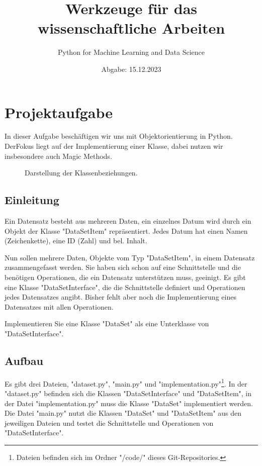 \documentclass[
 12pt, %
 a4paper, %
 parskip=full %
]{scrartcl}
\begin{document}
 \title{Werkzeuge für das wissenschaftliche Arbeiten}
 \subtitle{Python for Machine Learning and Data Science}
 \date{Abgabe: 15.12.2023}
 \maketitle
 \section{Projektaufgabe}
 
 In dieser Aufgabe beschäftigen wir uns mit Objektorientierung in Python. DerFokus liegt auf der Implementierung einer Klasse, dabei nutzen wir insbesondere auch Magic Methods.
 
 \begin{figure}
 \centering
 
 \caption{
 Darstellung der Klassenbeziehungen.
 } \label{fig:dur}
\end{figure}
 

    \subsection{Einleitung} Ein Datensatz besteht aus mehreren Daten, ein einzelnes Datum wird durch ein Objekt der Klasse "DataSetItem" repräsentiert.
    Jedes Datum hat einen Namen (Zeichenkette), eine ID (Zahl) und bel. Inhalt.\par

    Nun sollen mehrere Daten, Objekte vom Typ "DataSetItem", in einem Datensatz zusammengefasst werden.
    Sie haben sich schon auf eine Schnittstelle und die benötigen Operationen, die ein Datensatz unterstützen muss, geeinigt.
    Es gibt eine Klasse "DataSetInterface", die die Schnittstelle definiert und Operationen jedes Datensatzes angibt.
    Bisher fehlt aber noch die Implementierung eines Datensatzes mit allen Operationen.\par
    
    Implementieren Sie eine Klasse "DataSet" als eine Unterklasse von "DataSetInterface".

    \subsection{Aufbau} Es gibt drei Dateien, "dataset.py", "main.py" und 
    "implementation.py"\footnote{Dateien befinden sich im Ordner "/code/" dieses Git-Repositories.}.
    In der "dataset.py" befinden sich die Klassen "DataSetInterface" und "DataSetItem",
    in der Datei "implementation.py" muss die Klasse "DataSet" implementiert werden.
    Die Datei "main.py" nutzt die Klassen "DataSet" und "DataSetItem" aus den jeweiligen Dateien und testet die Schnittstelle und Operationen von "DataSetInterface".
\end{document}
